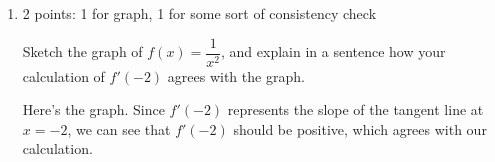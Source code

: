 \documentclass{article}
\providecommand{\check}{}
\renewcommand{\check}{\ifmmode{\text{ \ding{51} }}\else{\ding{51} }\fi}
\begin{document}
\begin{enumerate}
\begin{enumerate}
    \begin{solution}
      First, we can use the definition of the derivative to write $f'(-2)$
      as a limit.
      \begin{align*} 
        f'(-2) &=\lim_{ h \to 0 } \frac{ f(-2+h) - f(-2) }{(-2+h )- (- 2)} \\
        &= \lim_{h \to 0} \frac{ \dfrac{1}{(-2+h)^2} - \dfrac{1}{4}}{h}\\
        \intertext{Now we simplify the complex fraction.}
        &= \lim_{h \to 0} \frac{ \dfrac{1}{(-2+h)^2} - \dfrac{1}{4}}{h}
        \cdot \frac{4(-2+h)^2}{4(-2+h)^2} \\
        &=
        \lim_{ h \to 0 } \frac{ 4-(-2+h)^2}{4h(-2+h)^2}\\
        \intertext{Now we can expand $(-2+h)^2$ and combine like terms.}
        & =
        \lim_{ h \to 0 } \frac{ 4-(4-4h+h^2)}{4h\cdot(-2+h)^2} \\
        & =
        \lim_{ h \to 0 } \frac{ 4h-h^2}{4h(-2+h)^2}\\
        \intertext{Now we factor and cancel $h$ in the numerator and
        denominator.}
        & =
        \lim_{ h \to 0 } \frac{\cancel{h}(4-h)}{4\cancel{h}(-2+h)^2}\\
        & =
        \lim_{ h \to 0 } \frac{ 4-h}{4(-2+h)^2} \\
        \intertext{We can now determine the value that $\dfrac{4-h}{4(-2+h)}$
        approaches as $h$ approaches zero.}
        & = \frac{4-0}{4(-2+0)^2} = \frac{4}{16} = \boxed{\frac{1}{4}}
      \end{align*} 
    \end{solution} 

  \item

    \begin{grading}
      2 points: 1 for graph, 1 for some sort of consistency check
    \end{grading}

    \begin{problem}[\vfill]
      \check Sketch the graph of $f(x) = \dfrac{1}{x^2}$, and explain
      in a sentence how your calculation of $f'(-2)$ agrees with the
      graph. 
    \end{problem}

    \begin{solution}
      Here's the graph. Since $f'(-2)$ represents the slope of the tangent line at $x = -2$, we can see that $f'(-2)$ should be positive, which agrees with our calculation.
      \begin{center}
      \end{center}
    \end{solution}


\end{enumerate}
\end{enumerate}
\end{document}
